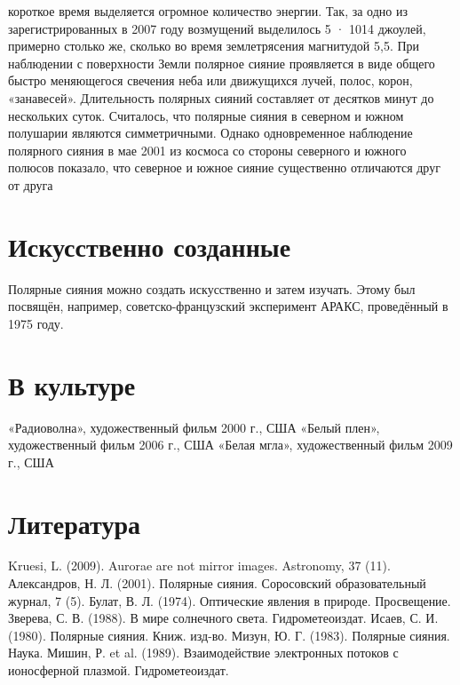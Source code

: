 \documentclass[a4paper,14pt]{article}
\begin{document}
короткое время выделяется огромное количество энергии. Так, за одно
из зарегистрированных в 2007 году возмущений выделилось 5 · 1014 джоулей, примерно столько же, сколько во время землетрясения магнитудой
5,5.
При наблюдении с поверхности Земли полярное сияние проявляется
в виде общего быстро меняющегося свечения неба или движущихся лучей, полос, корон, «занавесей». Длительность полярных сияний составляет от десятков минут до нескольких суток. Считалось, что полярные
сияния в северном и южном полушарии являются симметричными. Однако одновременное наблюдение полярного сияния в мае 2001 из космоса
со стороны северного и южного полюсов показало, что северное и южное сияние существенно отличаются друг от друга

\section{Искусственно созданные}
Полярные сияния можно создать искусственно и затем изучать. Этому был посвящён, например, советско-французский эксперимент АРАКС,
проведённый в 1975 году.

\section{В культуре}
 «Радиоволна», художественный фильм 2000 г., США
 «Белый плен», художественный фильм 2006 г., США
 «Белая мгла», художественный фильм 2009 г., США

\section{Литература}
Kruesi, L. (2009). Aurorae are not mirror images. Astronomy, 37 (11).
Александров, Н. Л. (2001). Полярные сияния. Соросовский образовательный журнал, 7 (5).
Булат, В. Л. (1974). Оптические явления в природе. Просвещение.
Зверева, С. В. (1988). В мире солнечного света. Гидрометеоиздат.
Исаев, С. И. (1980). Полярные сияния. Книж. изд-во.
Мизун, Ю. Г. (1983). Полярные сияния. Наука.
Мишин, Р. et al. (1989). Взаимодействие электронных потоков с ионосферной плазмой. Гидрометеоиздат.
\end{document}
